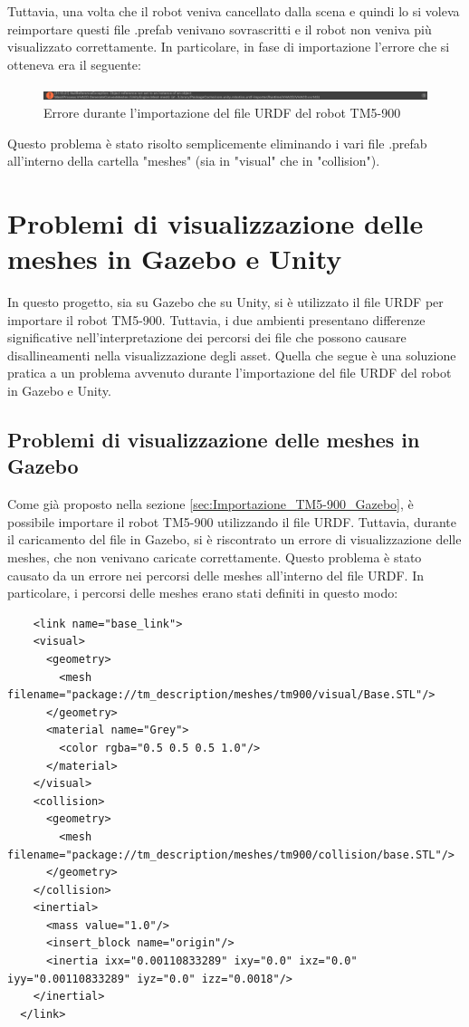 \documentclass[11pt]{report}
\begin{document}
Tuttavia, una volta che il robot veniva cancellato dalla scena e quindi lo si voleva reimportare questi file .prefab venivano sovrascritti e il robot non veniva più visualizzato correttamente. In particolare, in fase di importazione l'errore che si otteneva era il seguente:

\begin{figure} [H]
    \centering
    \includegraphics[width=1\textwidth]{images/errore_prefab.PNG}
    \caption{Errore durante l'importazione del file URDF del robot TM5-900}
    \label{fig:errore_prefab}
\end{figure}

Questo problema è stato risolto semplicemente eliminando i vari file .prefab all'interno della cartella "meshes" (sia in "visual" che in "collision").


\section{Problemi di visualizzazione delle meshes in Gazebo e Unity}
\label{sec:visualizzazione_meshes}
In questo progetto, sia su Gazebo che su Unity, si è utilizzato il file URDF per importare il robot TM5-900. Tuttavia, i due ambienti presentano differenze significative nell’interpretazione dei percorsi dei file che possono causare disallineamenti nella visualizzazione degli asset.
Quella che segue è una soluzione pratica a un problema avvenuto durante l'importazione del file URDF del robot in Gazebo e Unity.

\subsection{Problemi di visualizzazione delle meshes in Gazebo}
Come già proposto nella sezione \ref{sec:Importazione_TM5-900_Gazebo}, è possibile importare il robot TM5-900 utilizzando il file URDF. Tuttavia, durante il caricamento del file in Gazebo, si è riscontrato un errore di visualizzazione delle meshes, che non venivano caricate correttamente. Questo problema è stato causato da un errore nei percorsi delle meshes all'interno del file URDF. In particolare, i percorsi delle meshes erano stati definiti in questo modo:

\begin{verbatim}
    <link name="base_link">
    <visual>
      <geometry>
        <mesh filename="package://tm_description/meshes/tm900/visual/Base.STL"/>
      </geometry>
      <material name="Grey">
        <color rgba="0.5 0.5 0.5 1.0"/>
      </material>
    </visual>
    <collision>
      <geometry>
        <mesh filename="package://tm_description/meshes/tm900/collision/base.STL"/>
      </geometry>
    </collision>
    <inertial>
      <mass value="1.0"/>
      <insert_block name="origin"/>
      <inertia ixx="0.00110833289" ixy="0.0" ixz="0.0" iyy="0.00110833289" iyz="0.0" izz="0.0018"/>
    </inertial>
  </link>
\end{verbatim}
\end{document}
